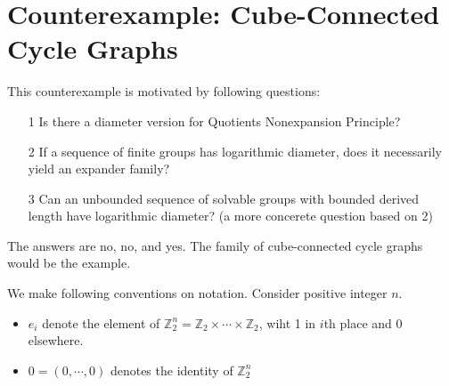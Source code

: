 \documentclass{book}
\newcommand{\Z}{\mathbb{Z}}
\theoremstyle{definition}
\theoremstyle{remarkstyle}
\begin{document}
\section{Counterexample: Cube-Connected Cycle Graphs}
This counterexample is motivated by following questions: 
\begin{itemize}
    \item[1] Is there a diameter version for Quotients Nonexpansion Principle?
    \item[2] If a sequence of finite groups has logarithmic diameter, does it necessarily yield an expander family?
    \item[3] Can an unbounded sequence of solvable groups with bounded derived length have logarithmic diameter? (a more concerete question based on 2)
\end{itemize}
The answers are no, no, and yes. The family of cube-connected cycle graphs would be the example. \newline

We make following conventions on notation. Consider positive integer $n$.
\begin{itemize}
    \item $e_{i} $ denote the element of $\Z^{n}_{2} = \Z_{2} \times \cdots \times \Z_{2} $, wiht 1 in $i$th place and 0 elsewhere. 
    \item $0 = (0, \cdots, 0) $ denotes the identity of $\Z^{n}_{2} $
    \item[] 
\end{itemize}
\end{document}
